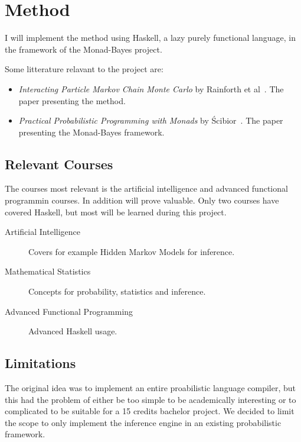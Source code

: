 \documentclass[a4paper, parskip]{scrartcl}
\begin{document}
\section{Method}
\label{sec:method}

I will implement the method using Haskell, a lazy purely functional language, in
the framework of the Monad-Bayes project.

Some litterature relavant to the project are:
\begin{itemize}
  \item \emph{Interacting Particle Markov Chain Monte Carlo} by Rainforth et
      al~\cite{rainforth}. The paper presenting the method.

    \item \emph{Practical Probabilistic Programming with Monads} by
        Ścibior~\cite{hbayes}. The paper presenting the Monad-Bayes
        framework.
\end{itemize}

\subsection{Relevant Courses}
\label{sec:relevant_courses}

The courses most relevant is the artificial intelligence and advanced
functional programmin courses. In addition will
prove valuable. Only two courses have covered Haskell, but most will be learned
during this project.

\begin{description}
  \item[Artificial Intelligence] Covers for example Hidden Markov Models for
    inference.

  \item[Mathematical Statistics] Concepts for probability, statistics and
    inference.

  \item[Advanced Functional Programming] Advanced Haskell usage.
\end{description}

\subsection{Limitations}
\label{sec:limitations}

The original idea was to implement an entire proabilistic language compiler,
but this had the problem of either be too simple to be academically interesting
or to complicated to be suitable for a 15 credits bachelor project. We decided
to limit the scope to only implement the inference engine in an existing
probabilistic framework.
\end{document}
